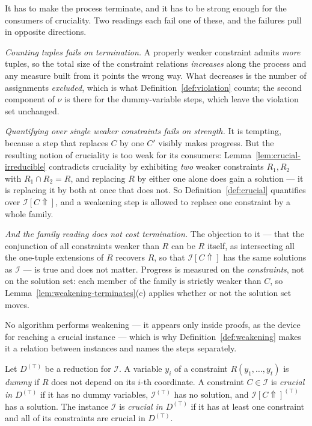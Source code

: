 \begin{hazard}\label{haz:weakening}
It has to make the process terminate, and it has to be strong enough for the
consumers of cruciality. Two readings each fail one of these, and the failures
pull in opposite directions.

\emph{Counting tuples fails on termination.} A properly weaker constraint admits
\emph{more} tuples, so the total size of the constraint relations
\emph{increases} along the process and any measure built from it points the
wrong way. What decreases is the number of assignments \emph{excluded}, which
is what Definition~\ref{def:violation} counts; the second component of $\nu$ is
there for the dummy-variable steps, which leave the violation set unchanged.

\emph{Quantifying over \emph{single} weaker constraints fails on strength.} It
is tempting, because a step that replaces $C$ by one $C'$ visibly makes
progress. But the resulting notion of cruciality is too weak for its consumers:
Lemma~\ref{lem:crucial-irreducible} contradicts cruciality by exhibiting
\emph{two} weaker constraints $R_{1},R_{2}$ with $R_{1}\cap R_{2}=R$, and
replacing $R$ by either one alone does gain a solution --- it is replacing it
by both at once that does not. So Definition~\ref{def:crucial} quantifies over
$\mathcal I[C\Uparrow]$, and a weakening step is allowed to replace one
constraint by a whole family.

\emph{And the family reading does not cost termination.} The objection to it
--- that the conjunction of all constraints weaker than $R$ can be $R$ itself,
as intersecting all the one-tuple extensions of $R$ recovers $R$, so that
$\mathcal I[C\Uparrow]$ has the same solutions as $\mathcal I$ --- is true and
does not matter. Progress is measured on the \emph{constraints}, not on the
solution set: each member of the family is strictly weaker than $C$, so
Lemma~\ref{lem:weakening-terminates}(c) applies whether or not the solution set
moves.

No algorithm performs weakening --- it appears only inside proofs, as the
device for reaching a crucial instance --- which is why
Definition~\ref{def:weakening} makes it a relation between instances and names
the steps separately.
\end{hazard}

\begin{definition}[Crucial]\label{def:crucial}
Let $D^{(\top)}$ be a reduction for $\mathcal I$. A variable $y_{i}$ of a
constraint $R(y_{1},\dots,y_{t})$ is \emph{dummy} if $R$ does not depend on its
$i$-th coordinate. A constraint $C\in\mathcal I$ is \emph{crucial in
$D^{(\top)}$} if it has no dummy variables, $\mathcal I^{(\top)}$ has no
solution, and $\mathcal I[C\Uparrow]^{(\top)}$ has a solution. The instance
$\mathcal I$ is \emph{crucial in $D^{(\top)}$} if
it has at least one constraint and all of its constraints are crucial in
$D^{(\top)}$.
\end{definition}


